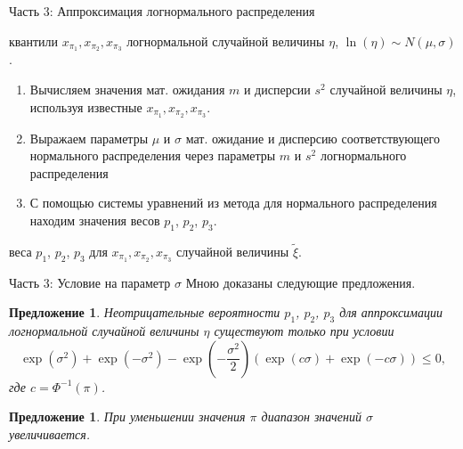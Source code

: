 \documentclass[ucs, notheorems, handout]{beamer}
\newtheorem{proposition2}[theorem]{Предложение}
\newenvironment{pr1}{\par\noindent{\bf Дано:}}{}
\newenvironment{pr3}{\par\noindent{\bf Результат:}}{}
\begin{document}
	\begin{frame}{Часть 3: Аппроксимация логнормального распределения}
		\begin{pr1}
			квантили $x_{\pi_{1}}, x_{\pi_{2}}, x_{\pi_{3}}$ логнормальной случайной величины $\eta$, $\ln(\eta) \sim N(\mu, \sigma)$.
		\end{pr1}
		
		\bigskip
		
		\begin{enumerate}
			\item Вычисляем значения мат. ожидания $m$ и дисперсии $s^{2}$ случайной величины $\eta$, используя известные $x_{\pi_{1}}, x_{\pi_{2}}, x_{\pi_{3}}$.
			\item Выражаем параметры $\mu$ и $\sigma$ мат. ожидание и дисперсию соответствующего нормального распределения через параметры $m$ и $s^{2}$ логнормального распределения
			\item С помощью системы уравнений из метода для нормального распределения находим значения весов $p_{1}$, $p_{2}$, $p_{3}$.
		\end{enumerate}
		\bigskip
		\begin{pr3}\end{pr3} веса $p_{1}$, $p_{2}$, $p_{3}$ для $x_{\pi_{1}}, x_{\pi_{2}}, x_{\pi_{3}}$ случайной величины $\tilde{\xi}$.
		
	\end{frame}
	
	\begin{frame}{Часть 3: Условие на параметр $\sigma$}
		Мною доказаны следующие предложения.
		\begin{proposition2}
			Неотрицательные вероятности $p_{1}$, $p_{2}$, $p_{3}$ для аппроксимации логнормальной случайной величины $\eta$ существуют только при условии \[\exp(\sigma^{2})+\exp(-\sigma^{2})-\exp\left( -\dfrac{\sigma^{2}}{2}\right) 
			(\exp(c\sigma)+\exp(-c\sigma))\leq 0,\] 
			где $c = \Phi^{-1}(\pi)$.
		\end{proposition2}
		
		\begin{proposition2}
			При уменьшении значения $\pi$ диапазон значений $\sigma$ увеличивается.
		\end{proposition2}
		
		
	\end{frame}
	
\end{document}

